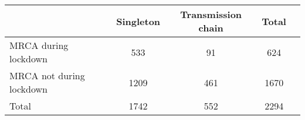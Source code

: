 \begin{tabular}{lcccc}
\hline
& Singleton & Transmission chain & Total \\ 
\hline
MRCA during lockdown & 533 &  91 & 624 \\ 
MRCA not during lockdown & 1209 & 461 & 1670 \\ 
Total & 1742 & 552 & 2294 \\ 
\hline
\end{tabular}
